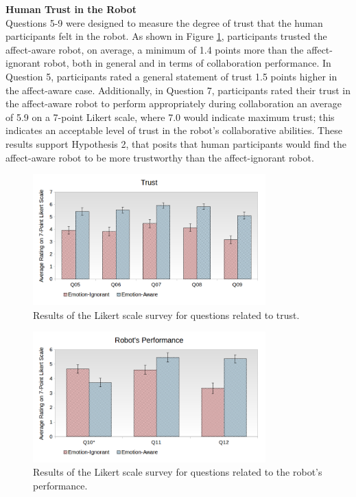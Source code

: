 \documentclass[12pt]{report}
\begin{document}
\hspace*{-8mm} \textbf{Human Trust in the Robot}
\label{sec:Trust}
\\ Questions 5-9 were designed to measure the degree of trust that the human
participants felt in the robot. As shown in Figure \ref{fig:overall-trust},
participants trusted the affect-aware robot, on average, a minimum of 1.4
points more than the affect-ignorant robot, both in general and in terms of
collaboration performance. In Question 5, participants rated a
general statement of trust 1.5 points higher in the affect-aware
case. Additionally, in Question 7, participants rated their trust in the
affect-aware robot to perform appropriately during collaboration an average of
5.9 on a 7-point Likert scale, where 7.0 would indicate maximum trust; this
indicates an acceptable level of trust in the robot's collaborative
abilities. These results support Hypothesis 2, that posits that human
participants would find the affect-aware robot to be more trustworthy than the
affect-ignorant robot.\\

\begin{figure}[t]
\centering
\includegraphics[width=0.8\textwidth]{figure/Overall-Trust.png}
\caption{Results of the Likert scale survey for questions related to trust.}
\label{fig:overall-trust}
\end{figure}

\begin{figure}[t]
\centering
\includegraphics[width=0.8\textwidth]{figure/Overall-Performance.png}
\vspace*{-5mm}
\caption{Results of the Likert scale survey for questions related to the robot's
performance.}
\label{fig:overall-performance}
\end{figure}
\end{document}
